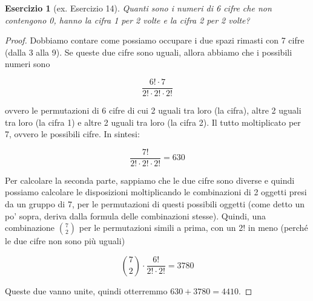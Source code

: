 \documentclass[12pt]{article}
\newtheorem{theorem}{Esercizio}
\begin{document}
\begin{theorem}[ex. Esercizio 14]
Quanti sono i numeri di 6 cifre che non contengono 0, hanno la cifra 1 per 2 volte e la cifra 2 per 2 volte?
\end{theorem}

\begin{proof}
Dobbiamo contare come possiamo occupare i due spazi rimasti con 7 cifre (dalla 3 alla 9). Se queste due cifre sono uguali, allora abbiamo che i possibili numeri sono 

$$\frac{6! \cdot 7}{2! \cdot 2! \cdot 2!}$$

ovvero le permutazioni di 6 cifre di cui 2 uguali tra loro (la cifra), altre 2 uguali tra loro (la cifra 1) e altre 2 uguali tra loro (la cifra 2). Il tutto moltiplicato per 7, ovvero le possibili cifre. In sintesi:
 
$$\frac{7!}{2! \cdot 2! \cdot 2!} = 630$$

Per calcolare la seconda parte, sappiamo che le due cifre sono diverse e quindi possiamo calcolare le disposizioni moltiplicando le combinazioni di 2 oggetti presi da un gruppo di 7, per le permutazioni di questi possibili oggetti (come detto un po' sopra, deriva dalla formula delle combinazioni stesse). Quindi, una combinazione ${7 \choose 2}$ per le permutazioni simili a prima, con un 2! in meno (perché le due cifre non sono più uguali)
 
$${7 \choose 2} \cdot \frac{6!}{2! \cdot 2!} = 3780$$

Queste due vanno unite, quindi otterremmo $630 + 3780 = 4410$.
\end{proof}
\end{document}
